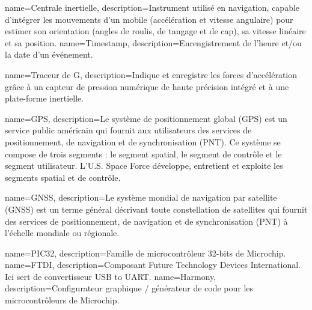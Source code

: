 
{
	name=Centrale inertielle,
	description={Instrument utilisé en navigation, capable d'intégrer les mouvements d'un mobile (accélération et vitesse angulaire) pour estimer son orientation (angles de roulis, de tangage et de cap), sa vitesse linéaire et sa position.}
}
{
	name=Timestamp,
	description={Enrengistrement de l'heure et/ou la date d'un événement.}
}

{
	name=Traceur de G,
	description={Indique et enregistre les forces d'accélération grâce à un capteur de pression numérique de haute précision intégré et à une plate-forme inertielle. }
}

{
	name=GPS,
	description={Le système de positionnement global (GPS) est un service public américain qui fournit aux utilisateurs des services de positionnement, de navigation et de synchronisation (PNT). Ce système se compose de trois segments : le segment spatial, le segment de contrôle et le segment utilisateur. L'U.S. Space Force développe, entretient et exploite les segments spatial et de contrôle.}
}

{
	name=GNSS,
	description={Le système mondial de navigation par satellite (GNSS) est un terme général décrivant toute constellation de satellites qui fournit des services de positionnement, de navigation et de synchronisation (PNT) à l'échelle mondiale ou régionale.}
}

{
	name=PIC32,
	description={Famille de microcontrôleur 32-bits de Microchip.}
}
{
	name=FTDI,
	description={Composant Future Technology Devices International. Ici sert de convertisseur USB to UART.}
}
{
	name=Harmony,
	description={Configurateur graphique / générateur de code pour les microcontrôleurs de Microchip.}
}







